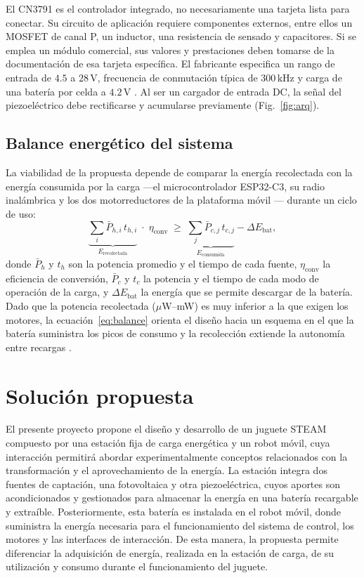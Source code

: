 \documentclass[11pt]{article}
\begin{document}
El CN3791 es el controlador integrado, no necesariamente una tarjeta lista
para conectar. Su circuito de aplicación requiere componentes externos,
entre ellos un MOSFET de canal P, un inductor, una resistencia de sensado y
capacitores. Si se emplea un módulo comercial, sus valores y prestaciones
deben tomarse de la documentación de esa tarjeta específica. El fabricante
especifica un rango de entrada de \(4.5\) a \(28\,\mathrm{V}\), frecuencia de
conmutación típica de \(300\,\mathrm{kHz}\) y carga de una batería por celda
a \(4.2\,\mathrm{V}\) \cite{consonance_cn3791_datasheet}. Al ser un cargador de entrada DC, la señal del
piezoeléctrico debe rectificarse y acumularse previamente
(Fig.~\ref{fig:arq}).
 
\subsection{Balance energético del sistema}
La viabilidad de la propuesta depende de comparar la energía recolectada con la
energía consumida por la carga —el microcontrolador ESP32-C3, su radio
inalámbrica y los dos motorreductores de la plataforma móvil
\cite{sigma2026rob0005}— durante un ciclo de uso:
\begin{equation}
  \underbrace{\textstyle\sum_i \bar{P}_{h,i}\, t_{h,i}}_{E_{\text{recolectada}}}
  \;\cdot\; \eta_{\text{conv}}
  \;\geq\;
  \underbrace{\textstyle\sum_j \bar{P}_{c,j}\, t_{c,j}}_{E_{\text{consumida}}}
  - \Delta E_{\text{bat}} ,
  \label{eq:balance}
\end{equation}
donde $\bar{P}_h$ y $t_h$ son la potencia promedio y el tiempo de cada fuente,
$\eta_{\text{conv}}$ la eficiencia de conversión, $\bar{P}_c$ y $t_c$ la
potencia y el tiempo de cada modo de operación de la carga, y
$\Delta E_{\text{bat}}$ la energía que se permite descargar de la batería.
Dado que la potencia recolectada ($\mu$W--mW) es muy inferior a la que exigen
los motores, la ecuación~\eqref{eq:balance} orienta el diseño hacia un esquema
en el que la batería suministra los picos de consumo y la recolección extiende
la autonomía entre recargas \cite{knight2008, sudevalayam2011}.


\newpage
\section{Solución propuesta }

El presente proyecto propone el diseño y desarrollo de un juguete STEAM compuesto por una estación fija de carga energética y un robot móvil, cuya interacción permitirá abordar experimentalmente conceptos relacionados con la transformación y el aprovechamiento de la energía. La estación integra dos fuentes de captación, una fotovoltaica y otra piezoeléctrica, cuyos aportes son acondicionados y gestionados para almacenar la energía en una batería recargable y extraíble. Posteriormente, esta batería es instalada en el robot móvil, donde suministra la energía necesaria para el funcionamiento del sistema de control, los motores y las interfaces de interacción. De esta manera, la propuesta permite diferenciar la adquisición de energía, realizada en la estación de carga, de su utilización y consumo durante el funcionamiento del juguete.
\end{document}
